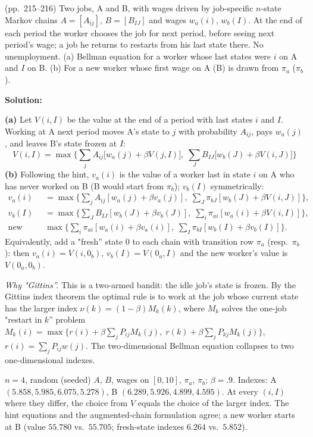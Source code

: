 \documentclass[12pt, letterpaper]{article}
\begin{document}
\begin{tcolorbox}[oddbox,title={Exercise 6.17 \quad Gittins Indexes for Beginners}]
\begin{tcolorbox}[questionbox]
(pp.~215--216) Two jobs, A and B, with wages driven by job-specific $n$-state Markov chains $A=[A_{ij}]$, $B=[B_{IJ}]$ and
wages $w_a(i)$, $w_b(I)$. At the end of each period the worker chooses the job for next period, before seeing
next period's wage; a job he returns to restarts from his last state there. No unemployment.
(a) Bellman equation for a worker whose last states were $i$ on A and $I$ on B. (b) For a new worker whose
first wage on A (B) is drawn from $\pi_a$ ($\pi_b$).
\end{tcolorbox}

\textbf{Solution:}

\textbf{(a)} Let $V(i,I)$ be the value at the end of a period with last states $i$ and $I$. Working at A next period
moves A's state to $j$ with probability $A_{ij}$, pays $w_a(j)$, and leaves B's state frozen at $I$:
\[
\boxed{V(i,I)=\max\Big\{\sum_jA_{ij}\big[w_a(j)+\beta V(j,I)\big],\;\sum_JB_{IJ}\big[w_b(J)+\beta V(i,J)\big]\Big\}}
\]
\textbf{(b)} Following the hint, $v_a(i)$ is the value of a worker last in state $i$ on A who has never worked on B (B
would start from $\pi_b$); $v_b(I)$ symmetrically:
\[
\boxed{\begin{aligned}
v_a(i)&=\max\Big\{\sum_jA_{ij}[w_a(j)+\beta v_a(j)],\;\sum_J\pi_{bJ}[w_b(J)+\beta V(i,J)]\Big\},\\
v_b(I)&=\max\Big\{\sum_JB_{IJ}[w_b(J)+\beta v_b(J)],\;\sum_i\pi_{ai}[w_a(i)+\beta V(i,I)]\Big\},\\
\text{new worker: }&\max\Big\{\sum_i\pi_{ai}[w_a(i)+\beta v_a(i)],\;\sum_I\pi_{bI}[w_b(I)+\beta v_b(I)]\Big\}.
\end{aligned}}
\]
Equivalently, add a "fresh'' state $0$ to each chain with transition row $\pi_a$ (resp.\ $\pi_b$): then
$v_a(i)=V(i,0_b)$, $v_b(I)=V(0_a,I)$ and the new worker's value is $V(0_a,0_b)$.

\emph{Why "Gittins''.} This is a two-armed bandit: the idle job's state is frozen. By the Gittins index
theorem the optimal rule is to work at the job whose current state has the larger index
$\nu(k)=(1-\beta)M_k(k)$, where $M_k$ solves the one-job "restart in $k$'' problem
$M_k(i)=\max\{r(i)+\beta\sum_jP_{ij}M_k(j),\;r(k)+\beta\sum_jP_{kj}M_k(j)\}$, $r(i)=\sum_jP_{ij}w(j)$. The two-dimensional
Bellman equation collapses to two one-dimensional indexes.

\begin{tcolorbox}[databox]
$n=4$, random (seeded) $A$, $B$, wages on $[0,10]$, $\pi_a$, $\pi_b$; $\beta=.9$. Indexes: A $(5.858,5.985,6.075,5.278)$,
B $(6.289,5.926,4.899,4.595)$. At every $(i,I)$ where they differ, the choice from $V$ equals the choice of the
larger index. The hint equations and the augmented-chain formulation agree; a new worker starts at B
(value $55.780$ vs.\ $55.705$; fresh-state indexes $6.264$ vs.\ $5.852$).
\end{tcolorbox}
\end{tcolorbox}
\end{document}
